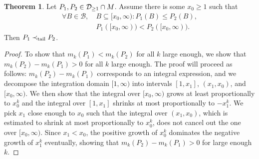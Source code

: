 \documentclass[a4paper,DIV=11,abstracton,twoside=semi]{scrreprt}
\newcommand{\B}{\mathcal{B}}
\newcommand{\M}{M}
\theoremstyle{definition}
\newtheorem{thm}{Theorem}[chapter] %
\begin{document}
    \begin{thm}
        Let $P_1, P_2 \in \Dgeqone \cap \M$. Assume there is some $x_0 \geq 1$ such that
        \begin{align}
            \forall B \in \B, &~B \subseteq [x_0, \infty): P_1(B) \leq P_2(B)  \label{eq:p2DominatesP1LeftOfX0},  \\
            &~P_1([x_0, \infty)) < P_2([x_0, \infty)) \label{eq:p2StrictlyDominatesP1OnB0}.
        \end{align}
        Then $P_1 \prec_{\text{tail}} P_2$.
        \label{thm:tailOrderSufficientConditionsGeneral}
    \end{thm}    
    \begin{proof}
        To show that $m_k(P_1) < m_k(P_2)$ for all $k$ large enough, we show that $m_k(P_2) - m_k(P_1) > 0$ for all $k$ large enough.
        The proof will proceed as follows: $m_k(P_2) - m_k(P_1)$ corresponds to an integral expression, and we decompose the integration domain $[1, \infty)$ into intervals $[1, x_1]$, $(x_1, x_0)$, and $[x_0, \infty)$. We then show that the integral over $[x_0, \infty)$ grows at least proportionally to $x_0^k$ and the integral over $[1, x_1]$ shrinks at most proportionally to $-x_1^k$. We pick $x_1$ close enough to $x_0$ such that the integral over $(x_1, x_0)$, which is estimated to shrink at most proportionally to $x_0^k$, does not cancel out the one over $[x_0, \infty)$. Since $x_1 < x_0$, the positive growth of $x_0^k$ dominates the negative growth of $x_1^k$ eventually, showing that $m_k(P_2) - m_k(P_1) > 0$ for large enough $k$.
        

\end{proof}
\end{document}
